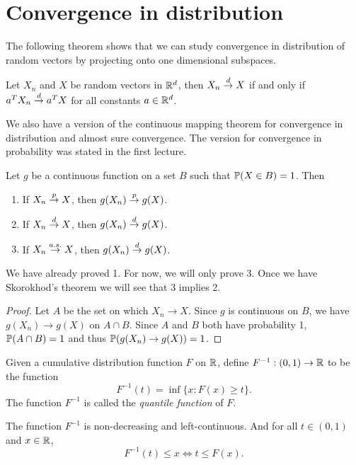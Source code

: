 \section{Convergence in distribution}
The following theorem shows that we can study convergence in distribution of random vectors by projecting onto one dimensional subspaces.
\begin{theorem}
    Let $X_n$ and $X$ be random vectors in ${\mathbb R}^d$, then $X_n \stackrel{d}{\to} X$ if and only if $a^T X_n \stackrel{d}{\to} a^T X$ for all constants $a \in {\mathbb R}^d$.
\end{theorem} 
We also have a version of the continuous mapping theorem for convergence in distribution and almost sure convergence. The version for convergence in probability was stated in the first lecture.
\begin{theorem}
    Let $g$ be a continuous function on a set $B$ such that ${\mathbb{P}}(X \in B) =1$. Then 
    \begin{enumerate}
        \item If $X_n \stackrel{p}{\to} X$, then $g(X_n) \stackrel{p}{\to} g(X)$.
        \item If $X_n \stackrel{d}{\to} X$, then $g(X_n) \stackrel{d}{\to} g(X)$.
        \item If $X_n \stackrel{a.s.}{\to} X$, then $g(X_n) \stackrel{d}{\to} g(X)$.
    \end{enumerate}
\end{theorem}
We have already proved 1. For now, we will only prove 3. Once we have Skorokhod's theorem we will see that 3 implies 2. 
\begin{proof}
    Let $A$ be the set on which $X_n \to X$. Since $g$ is continuous on $B$, we have $g(X_n) \to g(X)$ on $A \cap B$. Since $A$ and $B$ both have probability 1, ${\mathbb{P}}(A \cap B) =1 $ and thus ${\mathbb{P}}(g(X_n) \to g(X)) =1$. 
\end{proof}
\begin{definition}
    Given a cumulative distribution function $F$ on ${\mathbb R}$, define $F^{-1}:(0,1)\to {\mathbb R}$ to be the function
    \[F^{-1}(t) = \inf\{x : F(x) \ge t\}. \]
    The function $F^{-1}$ is called the \emph{quantile function} of $F$. 
\end{definition}
\begin{proposition}
    The function $F^{-1}$ is non-decreasing and left-continuous. And for all $t \in (0,1)$ and $x \in {\mathbb R}$,
    \[F^{-1}(t) \le x \Longleftrightarrow t \le F(x).\]
\end{proposition}
